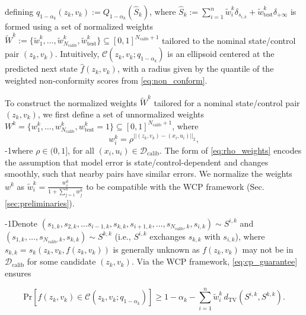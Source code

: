 \documentclass{l4dc2026}
\newcommand{\calib}{\mathcal{D}_{\mathrm{calib}}}
\newcommand{\tvd}{d_\textrm{TV}}
\begin{document}
defining $q_{1-\alpha_k}(z_k,v_k):=Q_{1-\alpha_k}(\hat{S}_k)$, where $\hat{S}_k := \sum_{i=1}^n \tilde w^k_i\delta_{s_{i,k}}+\tilde w^k_{\textrm{test}}\delta_{+\infty}$ is formed using a set of normalized weights $\tilde W^k := \{\tilde{w}_{1}^{k}, \dots, \tilde{w}_{N_\textrm{calib}}^{k}, \tilde w_\textrm{test}^k\} \subseteq [0,1]^{N_\textrm{calib}+1}$ tailored to the nominal state/control pair $(z_k,v_k)$. 
Intuitively, $\mathcal{C}(z_k,v_k; {q_{1-\alpha_k}})$ is an ellipsoid centered at the predicted next state $\hat{f}(z_k, v_k)$, with a radius given by the quantile of the weighted non-conformity scores from \eqref{eq:non_conform}. 

To construct the normalized weights $\tilde W^k$ tailored for a nominal state/control pair $(z_k,v_k)$, we first define a set of unnormalized weights $W^k = \{{w}_{1}^{k}, \dots, {w}_{N_\textrm{calib}}^{k}, w_\textrm{test}^k=1\} \subseteq [0,1]^{N_\textrm{calib}+1} $, where
\begin{equation}\label{eq:rho_weights}
    w^k_i = \rho^{||(z_k,v_k) - (x_i, u_i)||_2},
\end{equation}
\looseness-1where $\rho \in (0, 1]$, for all $(x_i, u_i)\in \calib$. The form of \eqref{eq:rho_weights} encodes the assumption that model error is state/control-dependent and changes smoothly, such that nearby pairs have similar errors. We normalize the weights $w^k$ as $\tilde w^k_i = \frac{w^k_i}{1 + \sum_{j=1}^{n}w^k_j}$ to be compatible with the WCP framework (Sec. \ref{sec:preliminaries}). 

\looseness-1Denote $(s_{1,k}, s_{2,k}, \ldots s_{i-1,k}, s_{k,k}, s_{i+1,k}, \ldots, s_{N_\textrm{calib},k}, s_{i,k}) \sim S^{i,k}$ and $(s_{1,k}, \ldots, s_{N_\textrm{calib},k}, s_{k,k}) \sim S^{k,k}$ (i.e., $S^{i,k}$ exchanges $s_{k,k}$ with $s_{i,k}$), where $s_{k,k} = s_k(z_k,v_k,f(z_k,v_k))$ is generally unknown as $f(z_k,v_k)$ may not be in $\calib$ for some candidate $(z_k, v_k)$. Via the WCP framework, \eqref{eq:cp_guarantee} ensures

\vspace{-8pt}
\begin{equation}\label{eq:cp_guarantee_f}\textstyle
    \textrm{Pr}[{f}(z_k, v_k) \in \mathcal{C}(z_{k}, v_{k};{q_{1-\alpha_k}})] \ge 1 - \alpha_k -\sum_{i=1}^{n}\tilde{w}_i^k\,\tvd(S^{i,k}, S^{k,k}).
\end{equation}
\vspace{-12pt}
\end{document}
